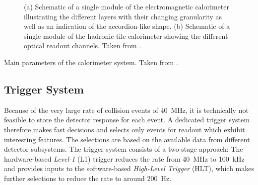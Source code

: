 \begin{figure}
    \caption{(a) Schematic of a single module of the electromagnetic calorimeter illustrating the different layers with their changing granularity as well as an indication of the accordion-like shape. (b) Schematic of a single module of the hadronic tile calorimeter showing the different optical readout channels. Taken from .}
    \label{fig:ATLASmodules}
\end{figure}

\begin{table}
    \caption{Main parameters of the calorimeter system. Taken from .}
    \label{tab:ATLAScalorimeter-parameters}
\end{table}


\subsection{Trigger System}
Because of the very large rate of collision events of \SI{40}{\mega\hertz}, it is technically not feasible to store the detector response for each event.
A dedicated trigger system therefore makes fast decisions and selects only events for readout which exhibit interesting features.
The selections are based on the available data from different detector subsystems.
The \RunTwo trigger system consists of a two-stage approach:
The hardware-based \emph{Level-1} (L1) trigger reduces the rate from \SI{40}{\mega\hertz} to \SI{100}{\kilo\hertz} and provides inputs to the software-based \emph{High-Level Trigger} (HLT), which makes further selections to reduce the rate to around \SI{200}{\hertz}.

